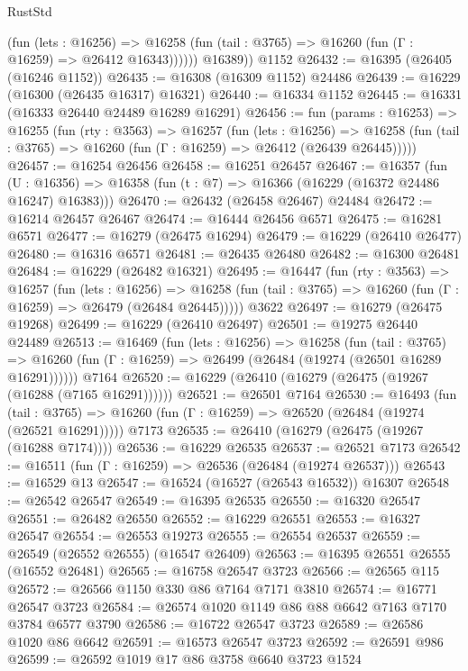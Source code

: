 \begin{lexlean}{RustStd}
\begin{coremodule}
              (fun (lets : @16256) =>
              @16258 (fun (tail : @3765) => @16260 (fun (Γ : @16259) => @26412 @16343))))))
        @16389))
    @1152
@26432 := @16395 (@26405 (@16246 @1152))
@26435 := @16308 (@16309 @1152) @24486
@26439 := @16229 (@16300 (@26435 @16317) @16321)
@26440 := @16334 @1152
@26445 := @16331 (@16333 @26440 @24489 @16289 @16291)
@26456 := fun (params : @16253) =>
  @16255
    (fun (rty : @3563) =>
    @16257
      (fun (lets : @16256) =>
      @16258 (fun (tail : @3765) => @16260 (fun (Γ : @16259) => @26412 (@26439 @26445)))))
@26457 := @16254 @26456
@26458 := @16251 @26457
@26467 := @16357
    (fun (U : @16356) => @16358 (fun (t : @7) => @16366 (@16229 (@16372 @24486 @16247) @16383)))
@26470 := @26432 (@26458 @26467) @24484
@26472 := @16214 @26457 @26467
@26474 := @16444 @26456 @6571
@26475 := @16281 @6571
@26477 := @16279 (@26475 @16294)
@26479 := @16229 (@26410 @26477)
@26480 := @16316 @6571
@26481 := @26435 @26480
@26482 := @16300 @26481
@26484 := @16229 (@26482 @16321)
@26495 := @16447
    (fun (rty : @3563) =>
    @16257
      (fun (lets : @16256) =>
      @16258 (fun (tail : @3765) => @16260 (fun (Γ : @16259) => @26479 (@26484 @26445)))))
    @3622
@26497 := @16279 (@26475 @19268)
@26499 := @16229 (@26410 @26497)
@26501 := @19275 @26440 @24489
@26513 := @16469
    (fun (lets : @16256) =>
    @16258
      (fun (tail : @3765) =>
      @16260 (fun (Γ : @16259) => @26499 (@26484 (@19274 (@26501 @16289 @16291))))))
    @7164
@26520 := @16229 (@26410 (@16279 (@26475 (@19267 (@16288 (@7165 @16291))))))
@26521 := @26501 @7164
@26530 := @16493
    (fun (tail : @3765) => @16260 (fun (Γ : @16259) => @26520 (@26484 (@19274 (@26521 @16291)))))
    @7173
@26535 := @26410 (@16279 (@26475 (@19267 (@16288 @7174))))
@26536 := @16229 @26535
@26537 := @26521 @7173
@26542 := @16511 (fun (Γ : @16259) => @26536 (@26484 (@19274 @26537)))
@26543 := @16529 @13
@26547 := @16524 (@16527 (@26543 @16532)) @16307
@26548 := @26542 @26547
@26549 := @16395 @26535
@26550 := @16320 @26547
@26551 := @26482 @26550
@26552 := @16229 @26551
@26553 := @16327 @26547
@26554 := @26553 @19273
@26555 := @26554 @26537
@26559 := @26549 (@26552 @26555) (@16547 @26409)
@26563 := @16395 @26551 @26555 (@16552 @26481)
@26565 := @16758 @26547 @3723
@26566 := @26565 @115
@26572 := @26566 @1150 @330 @86 @7164 @7171 @3810
@26574 := @16771 @26547 @3723
@26584 := @26574 @1020 @1149 @86 @88 @6642 @7163 @7170 @3784 @6577 @3790
@26586 := @16722 @26547 @3723
@26589 := @26586 @1020 @86 @6642
@26591 := @16573 @26547 @3723
@26592 := @26591 @986
@26599 := @26592 @1019 @17 @86 @3758 @6640 @3723 @1524

\end{coremodule}
\end{lexlean}
